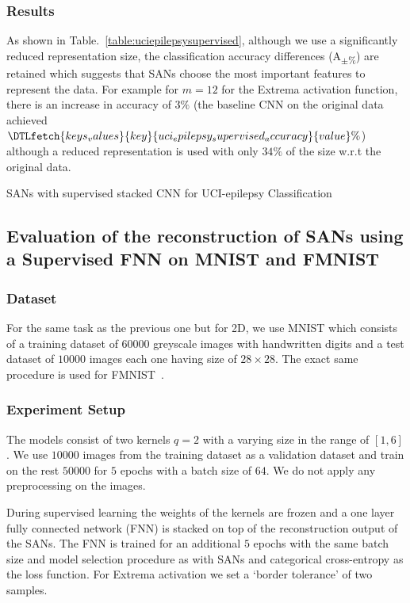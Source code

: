 \documentclass[journal]{IEEEtran}
\begin{document}
\subsubsection{Results}
As shown in Table.~\ref{table:uciepilepsysupervised}, although we use a significantly reduced representation size, the classification accuracy differences (A\textsubscript{$\pm$\%}) are retained which suggests that SANs choose the most important features to represent the data.
For example for $m=12$ for the Extrema activation function, there is an increase in accuracy of $3\%$ (the baseline CNN on the original data achieved $\DTLfetch{keys_values}{key}{uci_epilepsy_supervised_accuracy}{value}\%$) although a reduced representation is used with only $34\%$ of the size w.r.t the original data.

\begin{table*}[!t]
	\centering
	\caption{SANs with supervised stacked CNN for UCI-epilepsy Classification}
	\label{table:uciepilepsysupervised}
	\setlength\tabcolsep{4pt}
	
\end{table*}

\subsection{Evaluation of the reconstruction of SANs using a Supervised FNN on MNIST and FMNIST}
\subsubsection{Dataset}
For the same task as the previous one but for 2D, we use MNIST which consists of a training dataset of $60000$ greyscale images with handwritten digits and a test dataset of $10000$ images each one having size of $28\times 28$.
The exact same procedure is used for FMNIST~\cite{xiao2017fashion}.

\subsubsection{Experiment Setup}
The models consist of two kernels $q=2$ with a varying size in the range of $[1, 6]$.
We use $10000$ images from the training dataset as a validation dataset and train on the rest $50000$ for $5$ epochs with a batch size of $64$.
We do not apply any preprocessing on the images.

During supervised learning the weights of the kernels are frozen and a one layer fully connected network (FNN) is stacked on top of the reconstruction output of the SANs.
The FNN is trained for an additional $5$ epochs with the same batch size and model selection procedure as with SANs and categorical cross-entropy as the loss function.
For Extrema activation we set a `border tolerance' of two samples.
\end{document}
